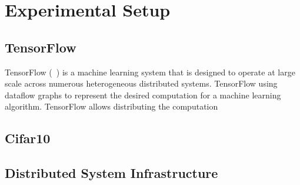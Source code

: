 \section{Experimental Setup}
\subsection{TensorFlow}
TensorFlow (~\cite{tensorflow}) is a machine learning system that is designed to operate at large scale across numerous heterogeneous distributed systems. TensorFlow using dataflow graphs to represent the desired computation for a machine learning algorithm. TensorFlow allows distributing the computation

\subsection{Cifar10}
\subsection{Distributed System Infrastructure}
